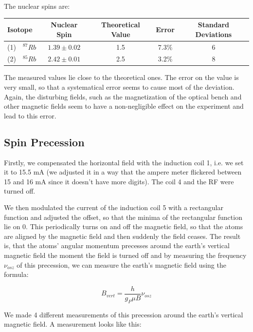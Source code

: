 The nuclear spins are:

\begin{center}
\begin{tabular}[H]{| l c c c c |}\hline
Isotope & Nuclear Spin & Theoretical Value & Error & Standard Deviations \\ \hline
(1)\ \ $^{87}Rb$ & $1.39 \pm 0.02$ & 1.5 & 7.3\% & 6 \\
(2)\ \ $^{85}Rb$ & $2.42 \pm 0.01$ & 2.5 & 3.2\% & 8\\  \hline
\end{tabular}
\end{center}

The measured values lie close to the theoretical ones. The error on the value is very small, so that a systematical error seems to cause most of the deviation. Again, the disturbing fields, such as the magnetization of the optical bench and other magnetic fields seem to have a non-negligible effect on the experiment and lead to this error.

\clearpage
\subsection{Spin Precession}

Firstly, we compensated the horizontal field with the induction coil 1, i.e. we set it to 15.5 mA (we adjusted it in a way that the ampere meter flickered between 15 and 16 mA since it doesn't have more digits). The coil 4 and the RF were turned off.

We then modulated the current of the induction coil 5 with a rectangular function and adjusted the offset, so that the minima of the rectangular function lie on 0. This periodically turns on and off the magnetic field, so that the atoms are aligned by the magnetic field and then suddenly the field ceases. The result is, that the atoms' angular momentum precesses around the earth's vertical magnetic field the moment the field is turned off and by measuring the frequency $\nu_{osz}$ of this precession, we can measure the earth's magnetic field using the formula:

$$ B_{vert} = \frac{h}{g_F\mu B}\nu_{osz} $$

We made 4 different measurements of this precession around the earth's vertical magnetic field. A measurement looks like this:

